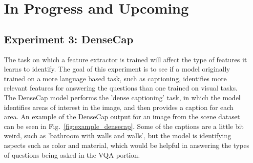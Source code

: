 \chapter{In Progress and Upcoming}
\section{Experiment 3: DenseCap}
The task on which a feature extractor is trained will affect the type of features it learns to identify. The goal of this experiment is to see if a model originally trained on a more language based task, such as captioning, identifies more relevant features for answering the questions than one trained on visual tasks. \\ %
The DenseCap model performs the 'dense captioning' task, in which the model identifies areas of interest in the image, and then provides a caption for each area\cite{densecap}. An example of the DenseCap output for an image from the scene dataset can be seen in Fig.~\ref{fig:example_densecap}. Some of the captions are a little bit weird, such as 'bathroom with walls and walls', but the model is identifying aspects such as color and material, which would be helpful in answering the types of questions being asked in the VQA portion. 



